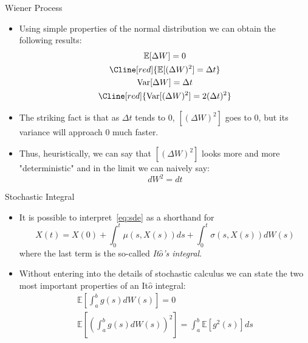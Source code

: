 \documentclass{beamer}
\begin{document}
\begin{frame}{Wiener Process}
	\begin{itemize}
		\item Using simple properties of the normal distribution we can obtain the following results:
			\begin{equation*}
				\begin{gathered}
					\mathbb{E}[\Delta W] = 0 \\
					\Cline[red]{\mathbb{E}[(\Delta W)^2] = \Delta t} \\
					\text{Var}[\Delta W] = \Delta t \\
					\Cline[red]{\text{Var}[(\Delta W)^2] = 2(\Delta t)^2} \\
				\end{gathered}
			\end{equation*}
		\item The striking fact is that as $\Delta t$ tends to 0, $[(\Delta W)^2]$ goes to 0, but its variance will approach 0 much faster.
		\item Thus, heuristically, we can say that $[(\Delta W)^2]$ looks more and more "deterministic" and in the limit we can naively say:
		\begin{equation*}
		\boxed{dW^2 = dt}
		\end{equation*}
	\end{itemize}
\end{frame}

\begin{frame}{Stochastic Integral}
	\begin{itemize}
		\item It is possible to interpret~\cref{eq:sde} as a shorthand for 
			\begin{equation*}
				X(t) = X(0) + \int_0^t \mu(s,X(s)) ds + \int_0^t \sigma(s,X(s)) dW(s)
			\end{equation*}
		where the last term is the so-called \emph{It$\hat{o}$'s integral}.
		\item Without entering into the details of stochastic calculus we can state the two most important properties of an It$\hat{o}$ integral:
			\begin{equation*}
				\begin{gathered}
					\mathbb{E}\left[\int_a^b g(s) dW(s)\right] = 0 \\
					\mathbb{E}\left[\left(\int_a^b g(s) dW(s)\right)^2\right] = \int_a^b\mathbb{E}[g^2(s)]ds\\
				\end{gathered}
			\end{equation*}
	\end{itemize}  
\end{frame}
\end{document}
